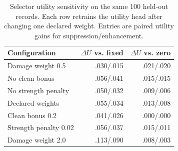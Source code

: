 \begin{table}[t]
\centering
\small
\setlength{\tabcolsep}{3.0pt}
\caption{Selector utility sensitivity on the same 100 held-out records. Each
row retrains the utility head after changing one declared weight. Entries are
paired utility gains for suppression/enhancement.}
\label{tab:utility-weight-sensitivity}
\begin{tabular}{@{}lrr@{}}
\toprule
Configuration & $\Delta U$ vs. fixed & $\Delta U$ vs. zero \\
\midrule
Damage weight 0.5 & .030/.015 & .021/.020 \\
No clean bonus & .056/.041 & .015/.015 \\
No strength penalty & .050/.032 & .009/.006 \\
Declared weights & .055/.034 & .013/.008 \\
Clean bonus 0.2 & .041/.026 & .000/.000 \\
Strength penalty 0.02 & .056/.037 & .015/.011 \\
Damage weight 2.0 & .113/.090 & .008/.003 \\
\bottomrule
\end{tabular}

\end{table}
